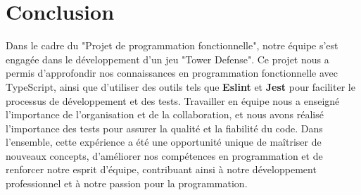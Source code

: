 \documentclass[11pt]{article}
\begin{document}
    \section{Conclusion}

   Dans le cadre du "Projet de programmation fonctionnelle", notre équipe s'est engagée dans le développement d'un jeu "Tower Defense". Ce projet nous a permis d'approfondir nos connaissances en programmation fonctionnelle avec TypeScript, ainsi que d'utiliser des outils tels que \textbf{Eslint} et \textbf{Jest} pour faciliter le processus de développement et des tests. Travailler en équipe nous a enseigné l'importance de l'organisation et de la collaboration, et nous avons réalisé l'importance des tests pour assurer la qualité et la fiabilité du code. Dans l'ensemble, cette expérience a été une opportunité unique de maîtriser de nouveaux concepts, d'améliorer nos compétences en programmation et de renforcer notre esprit d'équipe, contribuant ainsi à notre développement professionnel et à notre passion pour la programmation.
   
\end{document}
